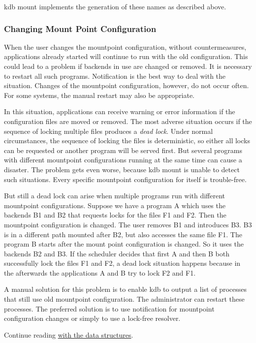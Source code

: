 {\ttfamily kdb mount} implements the generation of these names as described above.

\subsubsection*{Changing Mount Point Configuration}

When the user changes the mountpoint configuration, without countermeasures, applications already started will continue to run with the old configuration. This could lead to a problem if backends in use are changed or removed. It is necessary to restart all such programs. Notification is the best way to deal with the situation. Changes of the mountpoint configuration, however, do not occur often. For some systems, the manual restart may also be appropriate.

In this situation, applications can receive warning or error information if the configuration files are moved or removed. The most adverse situation occurs if the sequence of locking multiple files produces a {\itshape dead lock}. Under normal circumstances, the sequence of locking the files is deterministic, so either all locks can be requested or another program will be served first. But several programs with different mountpoint configurations running at the same time can cause a disaster. The problem gets even worse, because {\ttfamily kdb mount} is unable to detect such situations. Every specific mountpoint configuration for itself is trouble-\/free.

But still a dead lock can arise when multiple programs run with different mountpoint configurations. Suppose we have a program {\ttfamily A} which uses the backends {\ttfamily B1} and {\ttfamily B2} that requests locks for the files {\ttfamily F1} and {\ttfamily F2}. Then the mountpoint configuration is changed. The user removes {\ttfamily B1} and introduces {\ttfamily B3}. {\ttfamily B3} is in a different path mounted after {\ttfamily B2}, but also accesses the same file {\ttfamily F1}. The program {\ttfamily B} starts after the mount point configuration is changed. So it uses the backends {\ttfamily B2} and {\ttfamily B3}. If the scheduler decides that first {\ttfamily A} and then {\ttfamily B} both successfully lock the files {\ttfamily F1} and {\ttfamily F2}, a dead lock situation happens because in the afterwards the applications {\ttfamily A} and {\ttfamily B} try to lock {\ttfamily F2} and {\ttfamily F1}.

A manual solution for this problem is to enable {\ttfamily kdb} to output a list of processes that still use old mountpoint configuration. The administrator can restart these processes. The preferred solution is to use notification for mountpoint configuration changes or simply to use a lock-\/free resolver.

Continue reading \hyperlink{doc_dev_data-structures_md}{with the data structures}. 